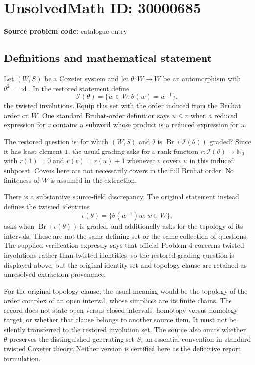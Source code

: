\documentclass[11pt]{article}
\newcommand{\N}{\mathbb{N}}
\begin{document}
\section*{UnsolvedMath ID: 30000685}
\textbf{Source problem code:} catalogue entry
\subsection{Definitions and mathematical statement}
Let $(W,S)$ be a Coxeter system and let $\theta:W\to W$ be an automorphism with $\theta^2=\operatorname{id}$. In the restored statement define
\[
 \mathcal I(\theta)=\{w\in W:\theta(w)=w^{-1}\},
\]
the twisted involutions. Equip this set with the order induced from the Bruhat order on $W$. One standard Bruhat-order definition says $u\le v$ when a reduced expression for $v$ contains a subword whose product is a reduced expression for $u$.

The restored question is: for which $(W,S)$ and $\theta$ is $\operatorname{Br}(\mathcal I(\theta))$ graded? Since it has least element $1$, the usual grading asks for a rank function $r:\mathcal I(\theta)\to\N_0$ with $r(1)=0$ and $r(v)=r(u)+1$ whenever $v$ covers $u$ in this induced subposet. Covers here are not necessarily covers in the full Bruhat order. No finiteness of $W$ is assumed in the extraction.

There is a substantive source-field discrepancy. The original statement instead defines the twisted identities
\[
 \iota(\theta)=\{\theta(w^{-1})w:w\in W\},
\]
asks when $\operatorname{Br}(\iota(\theta))$ is graded, and additionally asks for the topology of its intervals. These are not the same defining set or the same collection of questions. The supplied verification expressly says that official Problem 4 concerns twisted involutions rather than twisted identities, so the restored grading question is displayed above, but the original identity-set and topology clause are retained as unresolved extraction provenance.

For the original topology clause, the usual meaning would be the topology of the order complex of an open interval, whose simplices are its finite chains. The record does not state open versus closed intervals, homotopy versus homology target, or whether that clause belongs to another source item. It must not be silently transferred to the restored involution set. The source also omits whether $\theta$ preserves the distinguished generating set $S$, an essential convention in standard twisted Coxeter theory. Neither version is certified here as the definitive report formulation.
\end{document}
